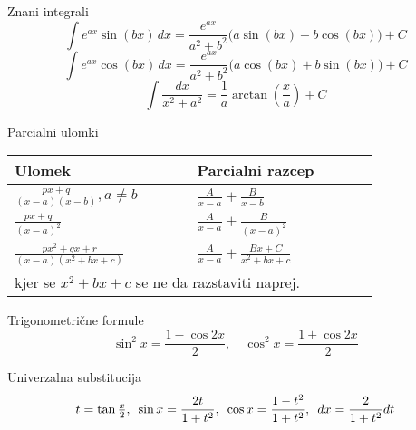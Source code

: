 \documentclass[a4paper,10pt]{article}
\begin{document}
\vspace*{5mm}
\begin{multicols}{2}


\begin{formulaBox}{Znani integrali}
\[
\int e^{ax}\sin(bx)\,dx = \frac{e^{ax}}{a^2+b^2}\big(a\sin(bx) - b\cos(bx)\big) + C
\]
\[
\int e^{ax}\cos(bx)\,dx = \frac{e^{ax}}{a^2+b^2}\big(a\cos(bx) + b\sin(bx)\big) + C
\]
\[
\int \frac{dx}{x^2+a^2} = \frac{1}{a}\arctan\!\left(\frac{x}{a}\right)+C
\]
\end{formulaBox}

\begin{formulaBox}{Parcialni ulomki}
	\\
\begin{tabular}{p{0.4\linewidth}p{0.4\linewidth}}
 Ulomek &  Parcialni razcep \\
\hline
$\displaystyle\frac{px+q}{(x-a)(x-b)}, a \ne b$ & $\displaystyle\frac{A}{x-a} + \frac{B}{x-b}$ \\[4mm]
$\displaystyle\frac{px+q}{(x-a)^2}$ & $\displaystyle\frac{A}{x-a} + \frac{B}{(x-a)^2}$ \\[4mm]
$\displaystyle\frac{px^2+qx+r}{(x-a)(x^2+bx+c)}$ & $\displaystyle\frac{A}{x-a} + \frac{Bx+C}{x^2+bx+c}$ \\[4mm]
\multicolumn{2}{p{\dimexpr.8\linewidth+4\tabcolsep\relax}}{%
    kjer se $x^2+bx+c$ se ne da razstaviti naprej.} \\
\end{tabular}
\end{formulaBox}

\begin{formulaBox}{Trigonometrične formule}
\[
\sin^2 x = \frac{1-\cos 2x}{2},\quad \cos^2 x = \frac{1+\cos 2x}{2}
\]
\end{formulaBox}

\begin{formulaBox}{Univerzalna substitucija}
\[t=\tan \tfrac{x}{2},\hspace{0.5em}
\sin x = \frac{2t}{1+t^2},\hspace{0.5em}
\cos x = \frac{1-t^2}{1+t^2},\hspace{0.5em}
dx=\frac{2}{1+t^2}dt
\]
\end{formulaBox}


\end{multicols}
\end{document}
